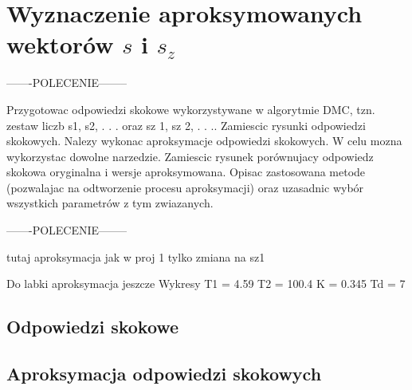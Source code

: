 \section{Wyznaczenie aproksymowanych wektorów $s$ i $s_z$ }

-------POLECENIE--------

Przygotowac odpowiedzi skokowe wykorzystywane w algorytmie DMC, tzn. zestaw
liczb s1, s2, . . . oraz sz
1, sz
2, . . .. Zamiescic rysunki odpowiedzi skokowych. Nalezy wykonac
aproksymacje odpowiedzi skokowych. W celu mozna wykorzystac dowolne narzedzie.
Zamiescic rysunek porównujacy odpowiedz skokowa oryginalna i wersje aproksymowana.
Opisac zastosowana metode (pozwalajac na odtworzenie procesu aproksymacji)
oraz uzasadnic wybór wszystkich parametrów z tym zwiazanych.

-------POLECENIE--------

tutaj aproksymacja jak w proj 1 tylko zmiana na sz1

Do labki aproksymacja jeszcze
Wykresy
T1 = 4.59 T2 = 100.4 K = 0.345 Td = 7

\subsection{Odpowiedzi skokowe}

\subsection{Aproksymacja odpowiedzi skokowych}
